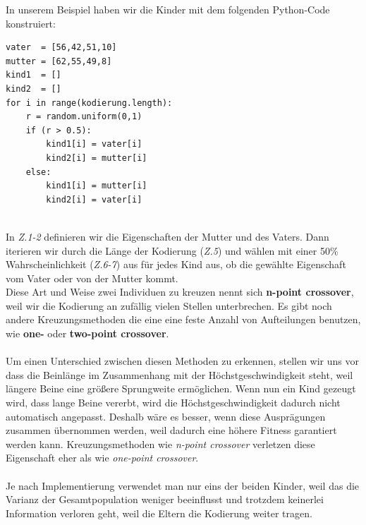             \newpage
            In unserem Beispiel haben wir die Kinder mit dem folgenden Python-Code konstruiert:
            \hfill \\
            \begin{mdframed}
            \begin{verbatim}
vater  = [56,42,51,10]
mutter = [62,55,49,8]
kind1  = []
kind2  = []
for i in range(kodierung.length):
    r = random.uniform(0,1)
    if (r > 0.5):
        kind1[i] = vater[i]
        kind2[i] = mutter[i]
    else:
        kind1[i] = mutter[i]
        kind2[i] = vater[i]
            \end{verbatim}
            \end{mdframed}
            \hfill \\[4mm]
            \noindent
            In \textit{Z.1-2} definieren wir die Eigenschaften der Mutter und des Vaters. Dann iterieren wir durch die Länge der Kodierung (\textit{Z.5}) und wählen mit einer 50\% Wahrscheinlichkeit (\textit{Z.6-7}) aus für jedes Kind aus, ob die gewählte Eigenschaft vom Vater oder von der Mutter kommt.\\

            \noindent
            Diese Art und Weise zwei Individuen zu kreuzen nennt sich \textbf{n-point crossover}, weil wir die Kodierung an zufällig vielen Stellen unterbrechen. Es gibt noch andere Kreuzungsmethoden die eine eine feste Anzahl von Aufteilungen benutzen, wie \textbf{one-} oder \textbf{two-point crossover}. \\
            \\
            \noindent
            Um einen Unterschied zwischen diesen Methoden zu erkennen, stellen wir uns vor dass die Beinlänge im Zusammenhang mit der Höchstgeschwindigkeit steht, weil längere Beine eine größere Sprungweite ermöglichen. Wenn nun ein Kind gezeugt wird, dass lange Beine vererbt, wird die Höchstgeschwindigkeit dadurch nicht automatisch angepasst. Deshalb wäre es besser, wenn diese Ausprägungen zusammen übernommen werden, weil dadurch eine höhere Fitness garantiert werden kann. Kreuzungsmethoden wie \textit{n-point crossover} verletzen diese Eigenschaft eher als wie \textit{one-point crossover}.\\
            \\
            \noindent
            Je nach Implementierung verwendet man nur eins der beiden Kinder, weil das die Varianz der Gesamtpopulation weniger beeinflusst und trotzdem keinerlei Information verloren geht, weil die Eltern die Kodierung weiter tragen.

